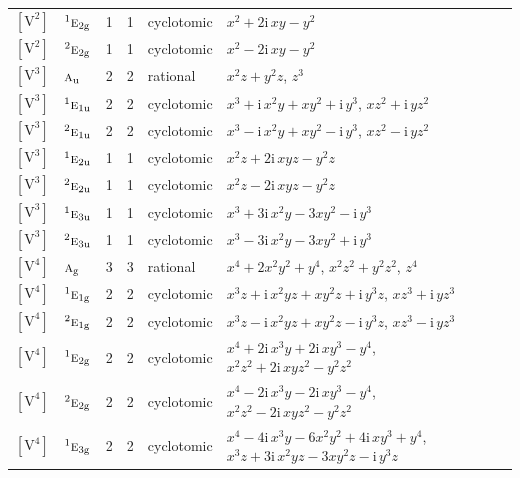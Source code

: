 \documentclass[10pt,a4paper]{article}
\numberwithin{equation}{section}
\newcommand{\irr}[1]{\text{\normalfont\scshape #1}}
\newcommand{\conjpair}[1]{{}^{#1}}
\newcommand{\ptag}[1]{\mathrm{#1}}
\newcommand{\iunit}{\mathrm{i}}
\newcommand{\jahn}[1]{\mathrm{#1}}
\newlength{\fillwidth}\newlength{\cellwidth}\newlength{\colwidth}
\begin{document}
{\begin{longtable}{@{}llrrl>{\RaggedRight\arraybackslash}p{\fillwidth}@{}}
$\jahn{[V^{2}]}$ & $\conjpair{1}\irr{e}_{2\ptag{g}}$ & 1 & 1 & cyclotomic & $x^{2} + 2\iunit{}\,xy - y^{2}$\\
$\jahn{[V^{2}]}$ & $\conjpair{2}\irr{e}_{2\ptag{g}}$ & 1 & 1 & cyclotomic & $x^{2} - 2\iunit{}\,xy - y^{2}$\\
$\jahn{[V^{3}]}$ & $\irr{a}_{\ptag{u}}$ & 2 & 2 & rational & $x^{2}z + y^{2}z$, $z^{3}$\\
$\jahn{[V^{3}]}$ & $\conjpair{1}\irr{e}_{1\ptag{u}}$ & 2 & 2 & cyclotomic & $x^{3} + \iunit{}\,x^{2}y + xy^{2} + \iunit{}\,y^{3}$, $xz^{2} + \iunit{}\,yz^{2}$\\
$\jahn{[V^{3}]}$ & $\conjpair{2}\irr{e}_{1\ptag{u}}$ & 2 & 2 & cyclotomic & $x^{3} - \iunit{}\,x^{2}y + xy^{2} - \iunit{}\,y^{3}$, $xz^{2} - \iunit{}\,yz^{2}$\\
$\jahn{[V^{3}]}$ & $\conjpair{1}\irr{e}_{2\ptag{u}}$ & 1 & 1 & cyclotomic & $x^{2}z + 2\iunit{}\,xyz - y^{2}z$\\
$\jahn{[V^{3}]}$ & $\conjpair{2}\irr{e}_{2\ptag{u}}$ & 1 & 1 & cyclotomic & $x^{2}z - 2\iunit{}\,xyz - y^{2}z$\\
$\jahn{[V^{3}]}$ & $\conjpair{1}\irr{e}_{3\ptag{u}}$ & 1 & 1 & cyclotomic & $x^{3} + 3\iunit{}\,x^{2}y - 3xy^{2} - \iunit{}\,y^{3}$\\
$\jahn{[V^{3}]}$ & $\conjpair{2}\irr{e}_{3\ptag{u}}$ & 1 & 1 & cyclotomic & $x^{3} - 3\iunit{}\,x^{2}y - 3xy^{2} + \iunit{}\,y^{3}$\\
$\jahn{[V^{4}]}$ & $\irr{a}_{\ptag{g}}$ & 3 & 3 & rational & $x^{4} + 2x^{2}y^{2} + y^{4}$, $x^{2}z^{2} + y^{2}z^{2}$, $z^{4}$\\
$\jahn{[V^{4}]}$ & $\conjpair{1}\irr{e}_{1\ptag{g}}$ & 2 & 2 & cyclotomic & $x^{3}z + \iunit{}\,x^{2}yz + xy^{2}z + \iunit{}\,y^{3}z$, $xz^{3} + \iunit{}\,yz^{3}$\\
$\jahn{[V^{4}]}$ & $\conjpair{2}\irr{e}_{1\ptag{g}}$ & 2 & 2 & cyclotomic & $x^{3}z - \iunit{}\,x^{2}yz + xy^{2}z - \iunit{}\,y^{3}z$, $xz^{3} - \iunit{}\,yz^{3}$\\
$\jahn{[V^{4}]}$ & $\conjpair{1}\irr{e}_{2\ptag{g}}$ & 2 & 2 & cyclotomic & $x^{4} + 2\iunit{}\,x^{3}y + 2\iunit{}\,xy^{3} - y^{4}$, $x^{2}z^{2} + 2\iunit{}\,xyz^{2} - y^{2}z^{2}$\\
$\jahn{[V^{4}]}$ & $\conjpair{2}\irr{e}_{2\ptag{g}}$ & 2 & 2 & cyclotomic & $x^{4} - 2\iunit{}\,x^{3}y - 2\iunit{}\,xy^{3} - y^{4}$, $x^{2}z^{2} - 2\iunit{}\,xyz^{2} - y^{2}z^{2}$\\
$\jahn{[V^{4}]}$ & $\conjpair{1}\irr{e}_{3\ptag{g}}$ & 2 & 2 & cyclotomic & $x^{4} - 4\iunit{}\,x^{3}y - 6x^{2}y^{2} + 4\iunit{}\,xy^{3} + y^{4}$, $x^{3}z + 3\iunit{}\,x^{2}yz - 3xy^{2}z - \iunit{}\,y^{3}z$\\

\end{longtable}}
\end{document}
